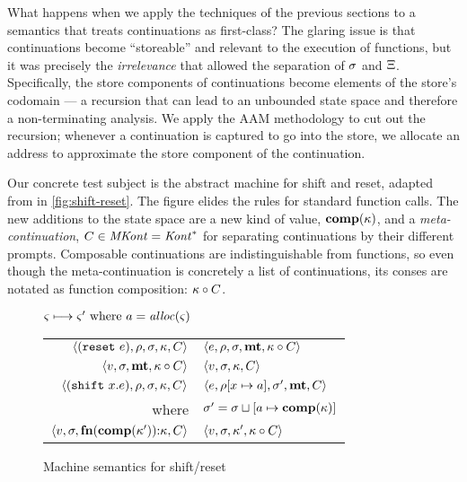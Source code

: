What happens when we apply the techniques of the previous sections to a semantics that treats continuations as first-class?
%
The glaring issue is that continuations become ``storeable'' and relevant to the execution of functions, but it was precisely the \emph{irrelevance} that allowed the separation of $\sigma$ and $\Xi$.
%
Specifically, the store components of continuations become elements of the store's codomain --- a recursion that can lead to an unbounded state space and therefore a non-terminating analysis.
%
We apply the AAM methodology to cut out the recursion; whenever a continuation is captured to go into the store, we allocate an address to approximate the store component of the continuation.

Our concrete test subject is the abstract machine for shift and reset, adapted from \citet{ianjohnson:Biernacki2006274} in \autoref{fig:shift-reset}.
%
The figure elides the rules for standard function calls.
%
The new additions to the state space are a new kind of value, $\mathbf{comp}(\kappa)$, and a \emph{meta-continuation}, $C \in \mathit{MKont} = \mathit{Kont}^*$ for separating continuations by their different prompts.
%
Composable continuations are indistinguishable from functions, so even though the meta-continuation is concretely a list of continuations, its conses are notated as function composition: $\kappa\circ C$.

\begin{figure}
  \centering
  $\varsigma \longmapsto \varsigma' \text{ where } a = \mathit{alloc}(\varsigma)$ \\
  \begin{tabular}{r|l}%
    \hline
    $\langle (\texttt{reset}\ e), \rho, \sigma, \kappa, C \rangle$
    &
    $\langle e, \rho, \sigma, \mathbf{mt}, \kappa\circ C \rangle$
    \\
    $\langle v, \sigma, \mathbf{mt}, \kappa\circ C \rangle$
    &
    $\langle v, \sigma, {\kappa}, {C} \rangle$
    \\
    $\langle (\texttt{shift}\ x. e), \rho, \sigma, \kappa, C \rangle$
    &
    $\langle e, \rho[x \mapsto a], \sigma',\mathbf{mt},C \rangle$
    \\ where & $\sigma' = \sigma\sqcup[a \mapsto \mathbf{comp}(\kappa)]$
    \\
    $\langle v,\sigma,\mathbf{fn}{}(\mathbf{comp}(\kappa')){\tt :} \kappa, C \rangle$
    &
    $\langle v, \sigma, \kappa', \kappa\circ C \rangle$
  \end{tabular}  
  \caption{Machine semantics for shift/reset}
  \label{fig:shift-reset}
\end{figure}


